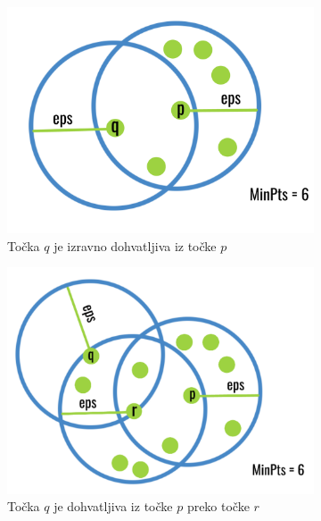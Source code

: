 \documentclass[utf8, diplomski, numeric]{fer}
\begin{document}
\begin{figure}[htp]
\begin{subfigure}{.3\textwidth}
\centering
\includegraphics[width=1\textwidth]{images/dbscan1.png}
\caption{Točka $q$ je izravno dohvatljiva iz točke $p$}
\end{subfigure}
\begin{subfigure}{.3\textwidth}
\centering
\includegraphics[width=1\textwidth]{images/dbscan2.png}
\caption{Točka $q$ je dohvatljiva iz točke $p$ preko točke $r$}
\end{subfigure}
\begin{subfigure}{.3\textwidth}
\centering

\end{subfigure}
\end{figure}
\end{document}
